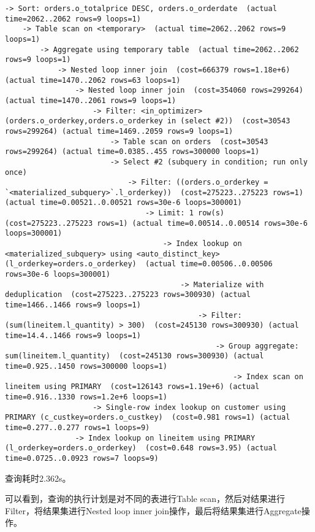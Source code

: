\documentclass{article}
\begin{document}
\begin{lstlisting}
-> Sort: orders.o_totalprice DESC, orders.o_orderdate  (actual time=2062..2062 rows=9 loops=1)
    -> Table scan on <temporary>  (actual time=2062..2062 rows=9 loops=1)
        -> Aggregate using temporary table  (actual time=2062..2062 rows=9 loops=1)
            -> Nested loop inner join  (cost=666379 rows=1.18e+6) (actual time=1470..2062 rows=63 loops=1)
                -> Nested loop inner join  (cost=354060 rows=299264) (actual time=1470..2061 rows=9 loops=1)
                    -> Filter: <in_optimizer>(orders.o_orderkey,orders.o_orderkey in (select #2))  (cost=30543 rows=299264) (actual time=1469..2059 rows=9 loops=1)
                        -> Table scan on orders  (cost=30543 rows=299264) (actual time=0.0385..455 rows=300000 loops=1)
                        -> Select #2 (subquery in condition; run only once)
                            -> Filter: ((orders.o_orderkey = `<materialized_subquery>`.l_orderkey))  (cost=275223..275223 rows=1) (actual time=0.00521..0.00521 rows=30e-6 loops=300001)
                                -> Limit: 1 row(s)  (cost=275223..275223 rows=1) (actual time=0.00514..0.00514 rows=30e-6 loops=300001)
                                    -> Index lookup on <materialized_subquery> using <auto_distinct_key> (l_orderkey=orders.o_orderkey)  (actual time=0.00506..0.00506 rows=30e-6 loops=300001)
                                        -> Materialize with deduplication  (cost=275223..275223 rows=300930) (actual time=1466..1466 rows=9 loops=1)
                                            -> Filter: (sum(lineitem.l_quantity) > 300)  (cost=245130 rows=300930) (actual time=14.4..1466 rows=9 loops=1)
                                                -> Group aggregate: sum(lineitem.l_quantity)  (cost=245130 rows=300930) (actual time=0.925..1450 rows=300000 loops=1)
                                                    -> Index scan on lineitem using PRIMARY  (cost=126143 rows=1.19e+6) (actual time=0.916..1330 rows=1.2e+6 loops=1)
                    -> Single-row index lookup on customer using PRIMARY (c_custkey=orders.o_custkey)  (cost=0.981 rows=1) (actual time=0.277..0.277 rows=1 loops=9)
                -> Index lookup on lineitem using PRIMARY (l_orderkey=orders.o_orderkey)  (cost=0.648 rows=3.95) (actual time=0.0725..0.0923 rows=7 loops=9)
\end{lstlisting}

查询耗时2.362s。

可以看到，查询的执行计划是对不同的表进行Table scan，然后对结果进行Filter，将结果集进行Nested loop inner join操作，最后将结果集进行Aggregate操作。
\end{document}
